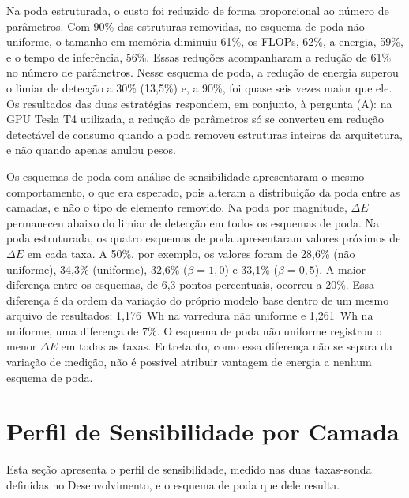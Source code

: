 Na poda estruturada, o custo foi reduzido de forma proporcional ao número de parâmetros. Com
90\% das estruturas removidas, no esquema de poda não uniforme, o tamanho em memória diminuiu
61\%, os FLOPs, 62\%, a energia, 59\%, e o tempo de inferência, 56\%. Essas reduções
acompanharam a redução de 61\% no número de parâmetros. Nesse esquema de poda, a redução de
energia superou o limiar de detecção a 30\% (13,5\%) e, a 90\%, foi quase seis vezes
maior que ele. Os resultados das duas estratégias respondem, em conjunto, à pergunta (A): na
GPU Tesla T4 utilizada, a redução de parâmetros só se converteu em redução detectável de
consumo quando a poda removeu estruturas inteiras da arquitetura, e não quando apenas anulou
pesos.

Os esquemas de poda com análise de sensibilidade apresentaram o mesmo comportamento, o que era
esperado, pois alteram a distribuição da poda entre as camadas, e não o tipo de elemento
removido. Na poda por magnitude, $\Delta E$ permaneceu abaixo do limiar de detecção em todos os
esquemas de poda. Na poda estruturada, os quatro esquemas de poda apresentaram valores próximos
de $\Delta E$ em cada taxa. A 50\%, por exemplo, os valores foram de 28,6\% (não uniforme),
34,3\% (uniforme), 32,6\% ($\beta = 1{,}0$) e 33,1\% ($\beta = 0{,}5$). A maior diferença entre
os esquemas, de 6,3 pontos percentuais, ocorreu a 20\%. Essa diferença é da ordem da variação
do próprio modelo base dentro de um mesmo arquivo de resultados: 1,176~Wh na varredura não
uniforme e 1,261~Wh na uniforme, uma diferença de 7\%. O esquema de poda não uniforme registrou
o menor $\Delta E$ em todas as taxas. Entretanto, como essa diferença não se separa da variação
de medição, não é possível atribuir vantagem de energia a nenhum esquema de poda.

\section{Perfil de Sensibilidade por Camada}\label{sec:perfil_sensibilidade}

Esta seção apresenta o perfil de sensibilidade, medido nas duas taxas-sonda definidas no
Desenvolvimento, e o esquema de poda que dele resulta.


